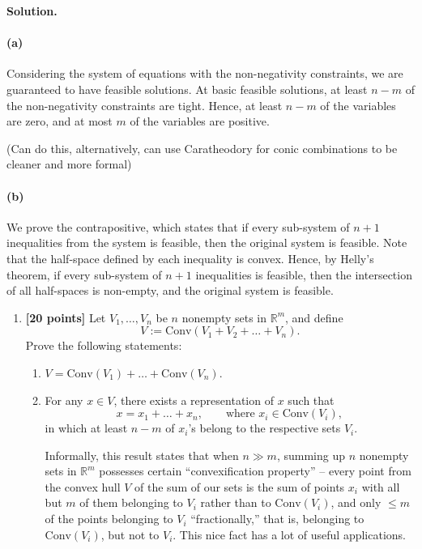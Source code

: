 \documentclass[11pt,letterpaper]{article}
\theoremstyle{definition}
\newcommand{\reals}{\mathbb{R}}
\newcommand{\Conv}{\mathrm{Conv}}
\newcommand{\solution}{\medskip\noindent\textbf{Solution.}\par\medskip}
\begin{document}
\solution
\paragraph{(a)} Considering the system of equations with the non-negativity constraints, we are guaranteed to have feasible solutions.
At basic feasible solutions, at least $n-m$ of the non-negativity constraints are tight.
Hence, at least $n-m$ of the variables are zero, and at most $m$ of the variables are positive.

(Can do this, alternatively, can use Caratheodory for conic combinations to be cleaner and more formal)

\paragraph{(b)} We prove the contrapositive, which states that if every sub-system of $n+1$ inequalities from the system is feasible, then the original system is feasible.
Note that the half-space defined by each inequality is convex.
Hence, by Helly's theorem, if every sub-system of $n+1$ inequalities is feasible, then the intersection of all half-spaces is non-empty, and the original system is feasible.


\begin{enumerate}[resume]
\item \textbf{[20 points]} Let $V_1,\ldots,V_n$ be $n$ nonempty sets in $\reals^m$, and define
\[
V := \Conv(V_1 + V_2 + \ldots + V_n).
\]
Prove the following statements:
\begin{enumerate}
\item $V = \Conv(V_1) + \ldots + \Conv(V_n)$.
\item For any $x\in V$, there exists a representation of $x$ such that
\[
x = x_1 + \ldots + x_n, \qquad \text{where } x_i \in \Conv(V_i),
\]
in which at least $n-m$ of $x_i$'s belong to the respective sets $V_i$.

Informally, this result states that when $n\gg m$, summing up $n$ nonempty sets in $\reals^m$ possesses certain ``convexification property'' -- every point from the convex hull $V$ of the sum of our sets is the sum of points $x_i$ with all but $m$ of them belonging to $V_i$ rather than to $\Conv(V_i)$, and only $\leq m$ of the points belonging to $V_i$ ``fractionally,'' that is, belonging to $\Conv(V_i)$, but not to $V_i$. This nice fact has a lot of useful applications.
\end{enumerate}
\end{enumerate}
\end{document}
